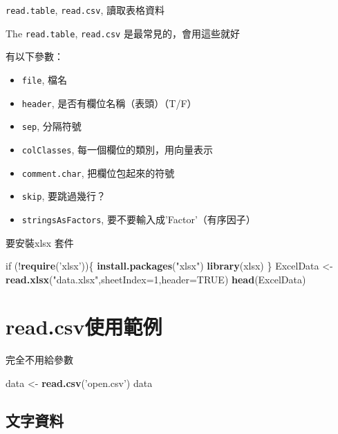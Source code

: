 \documentclass[]{book}
\newenvironment{Shaded}{\begin{snugshade}}{\end{snugshade}}
\newcommand{\KeywordTok}[1]{\textcolor[rgb]{0.13,0.29,0.53}{\textbf{{#1}}}}
\newcommand{\DataTypeTok}[1]{\textcolor[rgb]{0.13,0.29,0.53}{{#1}}}
\newcommand{\DecValTok}[1]{\textcolor[rgb]{0.00,0.00,0.81}{{#1}}}
\newcommand{\StringTok}[1]{\textcolor[rgb]{0.31,0.60,0.02}{{#1}}}
\newcommand{\OtherTok}[1]{\textcolor[rgb]{0.56,0.35,0.01}{{#1}}}
\newcommand{\NormalTok}[1]{{#1}}
\providecommand{\tightlist}{%
  \setlength{\itemsep}{0pt}\setlength{\parskip}{0pt}}
\theoremstyle{definition}
\theoremstyle{definition}
\theoremstyle{remark}
\begin{document}
\texttt{read.table}, \texttt{read.csv}, 讀取表格資料

The \texttt{read.table}, \texttt{read.csv} 是最常見的，會用這些就好

有以下參數：

\begin{itemize}
\tightlist
\item
  \texttt{file}, 檔名
\item
  \texttt{header}, 是否有欄位名稱（表頭）（T/F）
\item
  \texttt{sep}, 分隔符號
\item
  \texttt{colClasses}, 每一個欄位的類別，用向量表示
\item
  \texttt{comment.char}, 把欄位包起來的符號
\item
  \texttt{skip}, 要跳過幾行？
\item
  \texttt{stringsAsFactors}, 要不要輸入成'Factor'（有序因子）
\end{itemize}

要安裝xlsx 套件

\begin{Shaded}
\begin{Highlighting}[]
\NormalTok{if (!}\KeywordTok{require}\NormalTok{(}\StringTok{'xlsx'}\NormalTok{))\{}
    \KeywordTok{install.packages}\NormalTok{(}\StringTok{"xlsx"}\NormalTok{)}
    \KeywordTok{library}\NormalTok{(xlsx)}
\NormalTok{\}}
\NormalTok{ExcelData <-}\StringTok{ }\KeywordTok{read.xlsx}\NormalTok{(}\StringTok{"data.xlsx"}\NormalTok{,}\DataTypeTok{sheetIndex=}\DecValTok{1}\NormalTok{,}\DataTypeTok{header=}\OtherTok{TRUE}\NormalTok{)}
\KeywordTok{head}\NormalTok{(ExcelData)}
\end{Highlighting}
\end{Shaded}

\section{read.csv使用範例}\label{read.csv}

完全不用給參數

\begin{Shaded}
\begin{Highlighting}[]
\NormalTok{data <-}\StringTok{ }\KeywordTok{read.csv}\NormalTok{(}\StringTok{'open.csv'}\NormalTok{)}
\NormalTok{data}
\end{Highlighting}
\end{Shaded}

\subsection{文字資料}
\end{document}
